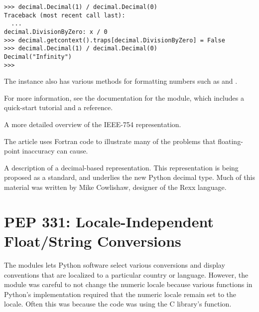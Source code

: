 \documentclass{howto}
\begin{document}
\begin{verbatim}
>>> decimal.Decimal(1) / decimal.Decimal(0)
Traceback (most recent call last):
  ...
decimal.DivisionByZero: x / 0
>>> decimal.getcontext().traps[decimal.DivisionByZero] = False
>>> decimal.Decimal(1) / decimal.Decimal(0)
Decimal("Infinity")
>>> 
\end{verbatim}

The  instance also has various methods for formatting 
numbers such as  and .

For more information, see the documentation for the 
module, which includes a quick-start tutorial and a reference.

\begin{seealso}

{A more detailed overview of the IEEE-754 representation.}

{The article uses Fortran code to illustrate many of the problems
that floating-point inaccuracy can cause.}

{A description of a decimal-based representation.  This representation
is being proposed as a standard, and underlies the new Python decimal
type.  Much of this material was written by Mike Cowlishaw, designer of the
Rexx language.}

\end{seealso}      


\section{PEP 331: Locale-Independent Float/String Conversions}

The  modules lets Python software select various
conversions and display conventions that are localized to a particular
country or language.  However, the module was careful to not change
the numeric locale because various functions in Python's
implementation required that the numeric locale remain set to the
 locale.  Often this was because the code was using the C library's
 function.  
\end{document}
